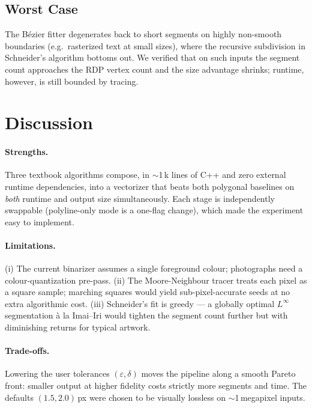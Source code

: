 \documentclass[twocolumn,a4paper,10pt]{article}
\begin{document}
\subsection{Worst Case}
The B\'ezier fitter degenerates back to short segments on highly
non-smooth boundaries (e.g.\ rasterized text at small sizes), where
the recursive subdivision in Schneider's algorithm bottoms out.  We
verified that on such inputs the segment count approaches the RDP
vertex count and the size advantage shrinks; runtime, however, is
still bounded by tracing.

\section{Discussion}
\label{sec:discussion}

\paragraph*{Strengths.}  Three textbook algorithms compose, in $\sim$1\,k
lines of C++ and zero external runtime dependencies, into a vectorizer
that beats both polygonal baselines on \emph{both} runtime and output
size simultaneously.  Each stage is independently swappable
(polyline-only mode is a one-flag change), which made the experiment
easy to implement.

\paragraph*{Limitations.}  (i) The current binarizer assumes a single
foreground colour; photographs need a colour-quantization pre-pass.
(ii) The Moore-Neighbour tracer treats each pixel as a square sample;
marching squares would yield sub-pixel-accurate seeds at no extra
algorithmic cost.  (iii) Schneider's fit is greedy --- a globally
optimal $L^\infty$ segmentation \`a la Imai--Iri would tighten the
segment count further but with diminishing returns for typical
artwork.

\paragraph*{Trade-offs.}  Lowering the user tolerances $(\varepsilon,
\delta)$ moves the pipeline along a smooth Pareto front: smaller
output at higher fidelity costs strictly more segments and time.  The
defaults $(1.5, 2.0)$\,px were chosen to be visually lossless on
$\sim$1\,megapixel inputs.
\end{document}
